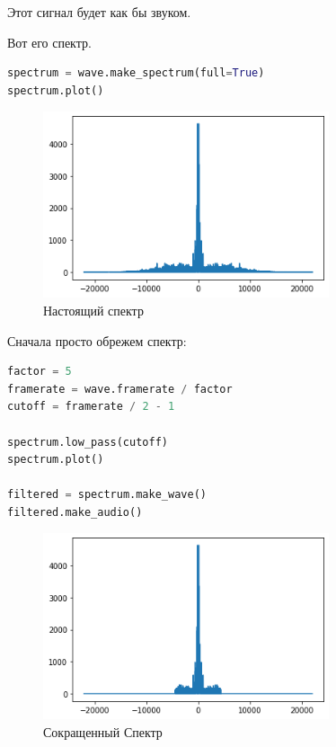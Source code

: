 \documentclass[a4paper,12pt]{report}
\begin{document}
    Этот сигнал будет как бы  звуком. 
    
    Вот его спектр.
    
\begin{lstlisting}[language=Python,caption=Спектр]
spectrum = wave.make_spectrum(full=True)
spectrum.plot()
\end{lstlisting}

    \begin{figure}[H]
        \centering
        \includegraphics[width=0.75\textwidth]{images/ex2_spectrum.png}
        \caption{Настоящий спектр}
        \label{fig:ex2_spectrum}
    \end{figure}

    Сначала просто обрежем спектр:

\begin{lstlisting}[language=Python,caption=Сокращенный спектр]
factor = 5
framerate = wave.framerate / factor
cutoff = framerate / 2 - 1

spectrum.low_pass(cutoff)
spectrum.plot()

filtered = spectrum.make_wave()
filtered.make_audio()
\end{lstlisting}

    \begin{figure}[H]
        \centering
        \includegraphics[width=0.75\textwidth]{images/ex2_filtered.png}
        \caption{Сокращенный Спектр}
        \label{fig:ex2_filtered}
    \end{figure}
\end{document}
